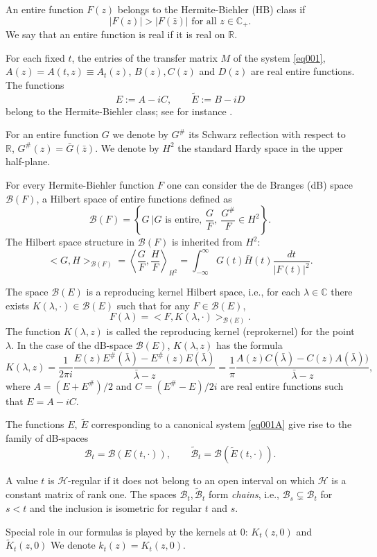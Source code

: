 \documentclass[11pt,twoside,reqno]{amsart}
\def\ti{\tilde}
\def\R{{\mathbb R}}
\def\C{{\mathbb{C}}}
\def\BB{{\mathcal B}}
\def\HH{{\mathcal H}}
\def\l{\lambda}
\theoremstyle{plain}
\numberwithin{equation}{section}
\begin{document}
An entire function $F(z)$ belongs to the Hermite-Biehler (HB) class if 
$$|F(z)|>|F(\bar z)|\textrm{ for all }z\in \C_+.$$
We say that an entire function is real if it is real on $\R$.

For each fixed $t$, the entries of the transfer matrix $M$ of the system \eqref{eq001}, $A(z)=A(t,z)\equiv A_t(z)$, $B(z), C(z)$ and $D(z)$ are real entire functions. The functions
$$E:= A-iC,\qquad \tilde E:= B-iD$$
belong to the Hermite-Biehler class; see for instance \cite{Rem}.

For an entire function $G$ we denote by $G^\#$ its Schwarz reflection with respect to $\R$,
$G^\#(z)=\bar G(\bar z)$. We denote by $H^2$ the standard Hardy space in the upper half-plane.

For every Hermite-Biehler function $F$ one can consider the de Branges  (dB) space $\BB(F)$, a Hilbert space of
entire functions defined as
$$\BB(F)=\left\{G\ | G\text{ is entire, }\frac GF,\ \frac {G^\#}F\in H^2\right\}.$$
The Hilbert space structure in $\BB(F)$ is inherited from $H^2$:
$$<G,H>_{\BB(F)}=\left<\frac GF,\frac HF\right>_{H^2}=\int_{-\infty}^{\infty}G(t)\bar H(t)\frac{dt}{|F(t)|^2}.$$


The space $\BB(E)$ is a reproducing kernel Hilbert space, i.e., for each $\l\in\C$ there exists  $K(\l,\cdot)\in \BB(E)$ such that for any $F\in \BB(E)$,
$$F(\l)=<F,K(\l,\cdot)>_{\BB(E)}.$$
The function $K(\l,z)$ is called the reproducing kernel  (reprokernel) for the point $\l$. In the case of the dB-space $\BB(E)$, $K(\l,z)$  has the formula
$$K(\l,z)=\frac{1}{2\pi i}\frac{  E(z) E^\#(\bar \l)- E^\#(z)E(\bar \l)}{\bar \l -z }=\frac{1}{\pi }\frac{A(z) C(\bar \l) - C(z)A(\bar \l))}{\bar \l-z},
$$
where $A=(E+E^\#)/2$ and $C=(E^\#-E)/2i$ are real entire functions such that $E=A-iC$. 


The functions $E,\ \ti E$ corresponding to a canonical system \eqref{eq001A} give rise to the family
of dB-spaces 
$$\BB_t=\BB(E(t,\cdot)),\qquad \tilde\BB_t=\BB(\tilde E(t,\cdot)).$$

A value $t$ is $\HH$-regular if it does not belong to an open interval on
which $\HH$ is a constant matrix of rank one. The spaces $\BB_t,\ti \BB_t$
form {\it chains}, i.e., $\BB_s\subsetneq \BB_t$ for $s<t$ and the inclusion
is isometric for regular $t$ and $s$.

Special role in our formulas is played by the kernels at 0:  $K_t(z,0)$ and $\tilde K_t(z,0)$
We denote $k_t(z)=K_t(z,0)$.

%
%
\end{document}
